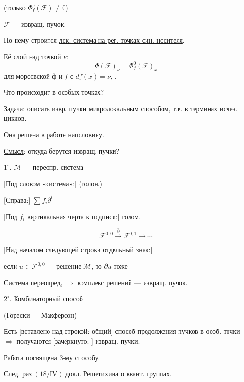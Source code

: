 (только $\Phi_f^0(\mathcal F)\neq0$)

$\mathcal F$ — извращ. пучок.

По нему строится \underline{лок. система на рег. точках син. носителя}.

Её слой над точкой $\nu$:
\begin{equation*}
\Phi(\mathcal F)_\nu=\Phi_f^0(\mathcal F)_x
\end{equation*}
для морсовской ф-и $f$ с $df(x)=\nu$, .

Что происходит в особых точках?

\underline{Задача}: описать извр. пучки микролокальным способом,
т.е. в терминах исчез. циклов.

Она решена в работе наполовину.

\underline{Смысл}: откуда берутся извращ. пучки?

$1^\circ$. $\mathcal M$ — переопр. система

[Под словом «система»:] (голон.)

[Справа:] $\sum f_i\partial^i$

[Под $f_i$ вертикальная черта к подписи:] голом.

\begin{equation*}
\mathcal F^{0,0}\overset{\bar\partial}{\longrightarrow}\mathcal F^{0,1}\longrightarrow\cdots
\end{equation*}

[Над началом следующей строки отдельный знак:] 

если $u\in\mathcal F^{0,0}$ — решение $\mathcal M$, то $\bar\partial u$ тоже

Система переопред, $\Rightarrow$ комплекс решений — извращ. пучок.


$2^\circ$. Комбинаторный способ

(Горески — Макферсон)

Есть [вставлено над строкой: общий] способ продолжения пучков в особ. точки $\Rightarrow$ получаются [зачёркнуто: ] извращ. пучки.

Работа посвящена $3$-му способу.

\underline{След. раз} $(18/\mathrm{IV})$ докл. \underline{Решетихина} о квант. группах.


